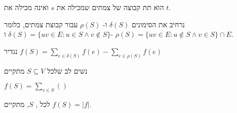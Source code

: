 \begin{definition}[\stcut]
\stcut{}
הוא תת קבוצה של צמתים שמכילה את $s$ ואינה מכילה את $t$.
\end{definition}

נרחיב את הסימונים 
$\delta(S)$
ו-%
$\rho(S)$
עבור קבוצת צמתים, כלומר
$\delta(S) = \{uv \in E : u \in S \land v \notin S\}$
ו-%
$\rho(S) = \{uv \in E : u \notin S \land v \in S\} \cap E$.

נגדיר
$f(S) = \sum_{e \in \delta(S)} f(e) - \sum_{e \in \rho(S)} f(e)$

נשים לב שלכל 
$S \subseteq V$
מתקיים
\begin{observation}
$f(S) = \sum_{v \in S} ()$
\end{observation}

\begin{claim}
לכל
\stcut, $S$,
מתקיים
$f(S) = |f|$.
\end{claim}
